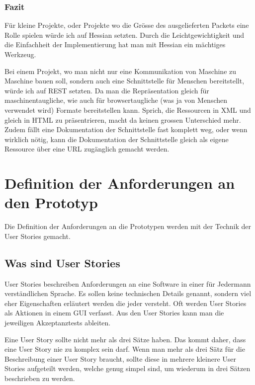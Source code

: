 \documentclass[abstracton, listof=totocnumbered,
bibliography=totocnumbered]{scrreprt}
\begin{document}
  \subsection{Fazit}
  
  Für kleine Projekte, oder Projekte wo die Grösse des ausgelieferten Packets
  eine Rolle spielen würde ich auf Hessian setzten. Durch die
  Leichtgewichtigkeit und die Einfachheit der Implementierung hat man mit
  Hessian ein mächtiges Werkzeug.
  
  Bei einem Projekt, wo man nicht nur eine Kommunikation von Maschine zu
  Maschine bauen soll, sondern auch eine Schnittstelle für Menschen
  bereitstellt, würde ich auf \ac{REST} setzten. Da man die Repräsentation
  gleich für maschinentaugliche, wie auch für browsertaugliche (was ja von
  Menschen verwendet wird) Formate bereitstellen kann. Sprich, die Ressourcen in
  \ac{XML} und gleich in \ac{HTML} zu präsentrieren, macht da keinen grossen
  Unterschied mehr. Zudem fällt eine Dokumentation der Schnittstelle fast
  komplett weg, oder wenn wirklich nötig, kann die Dokumentation der
  Schnittstelle gleich als eigene Ressource über eine \ac{URL} zugänglich
  gemacht werden.
  
  \newpage
  
  \chapter{Definition der Anforderungen an den Prototyp}
  
  Die Definition der Anforderungen an die Prototypen werden mit der Technik der
  User Sto\-ries\cite{UserStories} gemacht.
  
  \section{Was sind User Stories}
  
  User Stories beschreiben Anforderungen an eine Software in einer für Jedermann
  verständlichen Sprache. Es sollen keine technischen Details genannt, sondern
  viel eher Eigenschaften erläutert werden die jeder versteht. Oft werden User
  Stories als Aktionen in einem \ac{GUI} verfasst. Aus den User Stories kann
  man die jeweiligen Akzeptanztests\cite{AcceptanceTests} ableiten.
  
  Eine User Story sollte nicht mehr als drei Sätze haben. Das kommt daher, dass
  eine User Story nie zu komplex sein darf. Wenn man mehr als drei Sätz für die
  Beschreibung einer User Story braucht, sollte diese in mehrere kleinere User
  Stories aufgeteilt werden, welche genug simpel sind, um wiederum in drei
  Sätzen beschrieben zu werden.
  
\end{document}
